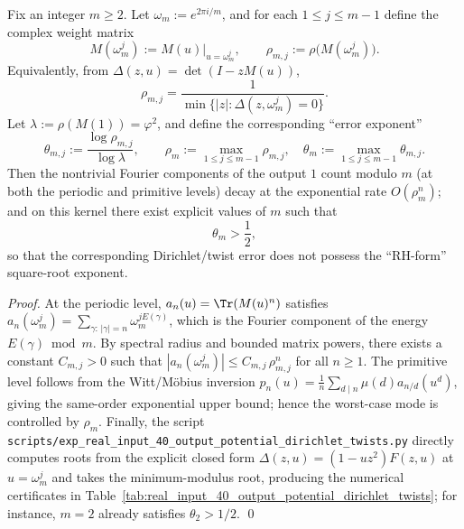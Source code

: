\begin{proposition}\label{prop:real-input-40-output-dirichlet-nonrh}
Fix an integer \(m\ge 2\). Let \(\omega_m:=e^{2\pi i/m}\), and for each \(1\le j\le m-1\) define the complex weight matrix
\[
M(\omega_m^j):=M(u)\big|_{u=\omega_m^j},
\qquad
\rho_{m,j}:=\rho\!\bigl(M(\omega_m^j)\bigr).
\]
Equivalently, from \(\Delta(z,u)=\det(I-zM(u))\),
\[
\rho_{m,j}=\frac{1}{\min\{|z|:\Delta(z,\omega_m^j)=0\}}.
\]
Let \(\lambda:=\rho(M(1))=\varphi^2\), and define the corresponding ``error exponent''
\[
\theta_{m,j}:=\frac{\log \rho_{m,j}}{\log \lambda},
\qquad
\rho_m:=\max_{1\le j\le m-1}\rho_{m,j},\quad
\theta_m:=\max_{1\le j\le m-1}\theta_{m,j}.
\]
Then the nontrivial Fourier components of the output $1$ count modulo $m$ (at both the periodic and primitive levels) decay at the exponential rate \(O(\rho_m^n)\); and on this kernel there exist explicit values of \(m\) such that
\[
\theta_m>\frac12,
\]
so that the corresponding Dirichlet/twist error does not possess the ``RH-form'' square-root exponent.
\end{proposition}
\begin{proof}
At the periodic level, \(a_n(u)=\Tr(M(u)^n)\) satisfies
\(
a_n(\omega_m^j)=\sum_{\gamma:\,|\gamma|=n}\omega_m^{jE(\gamma)}
\),
which is the Fourier component of the energy \(E(\gamma)\bmod m\). By spectral radius and bounded matrix powers, there exists a constant \(C_{m,j}>0\) such that
\(
|a_n(\omega_m^j)|\le C_{m,j}\,\rho_{m,j}^n
\)
for all \(n\ge 1\).
The primitive level follows from the Witt/M\"obius inversion
\(
p_n(u)=\frac1n\sum_{d\mid n}\mu(d)a_{n/d}(u^d)
\),
giving the same-order exponential upper bound; hence the worst-case mode is controlled by \(\rho_m\).
Finally, the script \texttt{scripts/exp\_real\_input\_40\_output\_potential\_dirichlet\_twists.py} directly computes roots from the explicit closed form \(\Delta(z,u)=(1-uz^2)F(z,u)\) at \(u=\omega_m^j\) and takes the minimum-modulus root, producing the numerical certificates in Table~\ref{tab:real_input_40_output_potential_dirichlet_twists}; for instance, \(m=2\) already satisfies \(\theta_2>1/2\). \qed
\end{proof}

